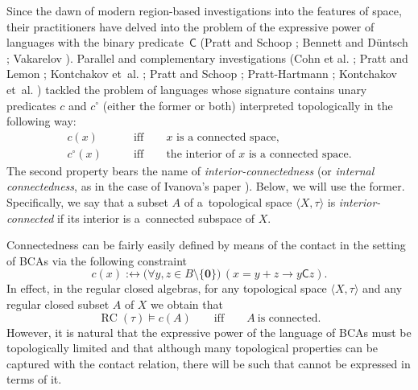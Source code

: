 \documentclass[a4paper,12pt]{amsart}
\numberwithin{equation}{section}
\theoremstyle{mytheoremstyle}
\newcommand\iffdef{\;\mathrel{\mathord{:}\mathord{\longleftrightarrow}}\;}
\DeclareMathOperator{\RCvtex}{RC}
\begin{document}
Since the dawn of modern region-based investigations into the features
of space, their practitioners have delved into the problem of the expressive
power of languages with the binary predicate~$\mathrel{\mathsf{C}}$
(Pratt and Schoop \cite{Pratt-Schoop-EIPPM};
Bennett and D\"{u}ntsch \cite{Bennett-Duntsch-AAT};
Vakarelov \cite{Vakarelov-RBTS}). Parallel and
complementary investigations (Cohn et al. \cite{Cohn-et-al-QSRARQTRCC};
Pratt and Lemon \cite{Pratt-Lemon-OPPM}; Kontchakov et~al. \cite{Kontchakov-et-al-TCAML};
Pratt and Schoop \cite{Pratt-Schoop-EIPPM}; Pratt-Hartmann \cite{Pratt-Hartmann-EARIRBTOS};
Kontchakov et~al. \cite{Kontchakov-et-al-SLWCP}) tackled the problem of languages whose
signature contains unary predicates $c$ and $c^{\circ}$ (either the former
or both) interpreted topologically in the following way:
%
\begin{align*}
c(x)\qquad &\text{iff}\qquad \text{$x$ is a connected space,}
\\
{c^{\circ}}(x)\qquad &\text{iff}\qquad \text{the interior of $x$ is a connected space.}
\end{align*}
%
The second property bears the name of \emph{interior-connectedness} (or
\emph{internal connectedness}, as in the case of Ivanova's paper \cite{Ivanova-ECAATC}). Below,
we will use the former. Specifically, we say that a subset $A$ of a~topological
space $  \langle X,\tau   \rangle $ is
\emph{interior-connected} if its interior is a~connected subspace of
$X$.

Connectedness can be fairly easily defined by means of the contact in the
setting of BCAs via the following constraint
%
\begin{equation*}
c(x)\iffdef \bigl(\forall y,z\in B\setminus \{\mathbf{0}\}\bigr)\,(x=y+z
\rightarrow y\mathrel{\mathsf{C}}z).
\end{equation*}
%
In effect, in the regular closed algebras, for any topological space
$  \langle X,\tau   \rangle $ and any regular closed subset
$A$ of $X$ we obtain that
%
\begin{equation*}
\RCvtex (\tau )\vDash c(A)\qquad \text{iff}\qquad A\ \text{is connected.}
\end{equation*}
%
However, it is natural that the expressive power of the language of BCAs
must be topologically limited and that although many topological properties
can be captured with the contact relation, there will be such that cannot
be expressed in terms of it.
\end{document}

